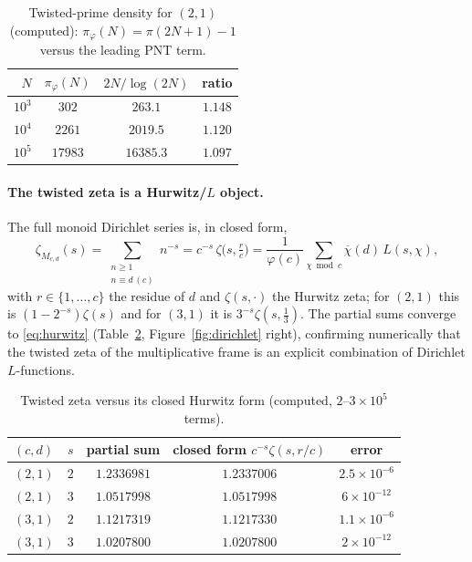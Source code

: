 \documentclass[11pt,a4paper]{article}
\theoremstyle{plain}
\theoremstyle{definition}
\theoremstyle{remark}
\begin{document}
\begin{table}[ht]
\centering
\caption{Twisted-prime density for $(2,1)$ (computed): $\pi_\varphi(N)=\pi(2N+1)-1$
versus the leading PNT term.}
\label{tab:density}
\begin{tabular}{rccc}
\toprule
$N$ & $\pi_\varphi(N)$ & $2N/\log(2N)$ & ratio \\
\midrule
$10^3$ & $302$ & $263.1$ & $1.148$ \\
$10^4$ & $2261$ & $2019.5$ & $1.120$ \\
$10^5$ & $17983$ & $16385.3$ & $1.097$ \\
\bottomrule
\end{tabular}
\end{table}

\paragraph{The twisted zeta is a Hurwitz/$L$ object.} The full monoid Dirichlet
series is, in closed form,
\begin{equation}\label{eq:hurwitz}
\zeta_{M_{c,d}}(s)=\sum_{\substack{n\ge1\\ n\equiv d\,(c)}}n^{-s}
=c^{-s}\,\zeta\!\bigl(s,\tfrac{r}{c}\bigr)
=\frac1{\varphi(c)}\sum_{\chi\bmod c}\overline{\chi}(d)\,L(s,\chi),
\end{equation}
with $r\in\{1,\dots,c\}$ the residue of $d$ and $\zeta(s,\cdot)$ the Hurwitz
zeta; for $(2,1)$ this is $(1-2^{-s})\zeta(s)$ and for $(3,1)$ it is
$3^{-s}\zeta(s,\tfrac13)$. The partial sums converge to \eqref{eq:hurwitz}
(Table~\ref{tab:zeta}, Figure~\ref{fig:dirichlet} right), confirming numerically
that the twisted zeta of the multiplicative frame is an explicit combination of
Dirichlet $L$-functions.

\begin{table}[ht]
\centering
\caption{Twisted zeta versus its closed Hurwitz form (computed,
$2$--$3\times10^5$ terms).}
\label{tab:zeta}
\begin{tabular}{lcccc}
\toprule
$(c,d)$ & $s$ & partial sum & closed form $c^{-s}\zeta(s,r/c)$ & error \\
\midrule
$(2,1)$ & $2$ & $1.2336981$ & $1.2337006$ & $2.5\times10^{-6}$ \\
$(2,1)$ & $3$ & $1.0517998$ & $1.0517998$ & $6\times10^{-12}$ \\
$(3,1)$ & $2$ & $1.1217319$ & $1.1217330$ & $1.1\times10^{-6}$ \\
$(3,1)$ & $3$ & $1.0207800$ & $1.0207800$ & $2\times10^{-12}$ \\
\bottomrule
\end{tabular}
\end{table}
\end{document}
